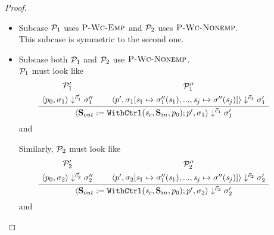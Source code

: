 \begin{proof}
\begin{itemize}
\begin{itemize}
	   	By IH on \eqref{\eqnumthree{23}} with $\MP_1''$, $\MP_2'$, \eqref{eq-lem24-c3-4}, we get a derivation 
	   	\[ \seval{p'}{\sgmbpp{1} \x{\S} \sgmbe{2}}{\cc }{\sgmpx}, \] 
	   	
	   	and replacing the start store with the right-hand side of \eqref{\eqnumthree{24}} gives us a derivation $\MP'$ of
	   	
	   	\[\seval{p'}{(\sgmx) [\s_1 \|-> \sgm_1''(\s_1),..., \s_j \|-> \sgm_1''(\s_j)]}{\cc }{\sgmpx} \] 
	   	
	   	With $\eqref{\eqnumthree{25}}$, we replcace $\sgm_1''(i)$ with $\sgm_0(i)$ for all $i \in \{1,...,j\}$, then we obtain  $\MP''$ of
	   	
   		\[\seval{p'}{(\sgmx) [\s_1 \|-> \sgm_0(\s_1),..., \s_j \|-> \sgm_0(\s_j)]}{\cc }{\sgmpx} \] 
   		
   		By the definition of store concatenation with $\eqref{\eqnumthree{20}}$, $\eqref{\eqnumthree{21}}$, we have
   		$$\sgmx(s_c) = \sgm_1(s_c) {\++} \sgm_2(s_c) = \c_1' =  \<()| ...\'>$$
   		
   		Therefore, we use the rule $\PName{Wc-Nonemp}$ to build $\MP$ as follows
   	
   		$$\PT{
   			\UCN{\MP_0}{\seval{p_0}{\sgmx}{\c_1'}{\sgm_0}}
   			\UCN{\MP''}{\seval{p'}{(\sgmx) [\s_1 \|-> \sgm_0(\s_1),..., \s_j \|-> \sgm_0(\s_j)]}{\cc }{\sgmpx}}
   			\BC{\seval{\casethree}{\sgmx}{\cc}{\sgmpx}}
   		}$$ and we are done. \\
   	
	\item Subcase $\mathcal{P}_1$ uses  $\textsc{P-Wc-Emp}$ and $\mathcal{P}_2$ uses $\PName{Wc-Nonemp}$. \\	
	This subcase is symmetric to the second one. \\
 		
	\item Subcase both $\mathcal{P}_1$ and $\mathcal{P}_2$ use $\PName{Wc-Nonemp}$. \\
 	$\mathcal{P}_1$ must look like
 	$$\PT{
 		\UCN{\MP_1'}{\seval{p_0}{\sgm_1}{\c_1'}{\sgm_1''}}
 		\UCN{\MP_1''}{\seval{p'}{\sgm_1[\s_1 \|-> \sgm_1''(\s_1),...,\s_j \|-> \sgm''(\s_j)]}{\c_1}{\sgm_1'}}
 		\BC{\seval{\casethree}{\sgm_1}{\c_1}{\sgm_1'}}
 	}$$
 	and 
 	
 	Similarly, $\mathcal{P}_2$ must look like
 	$$\PT{
 		\UCN{\MP_2'}{\seval{p_0}{\sgm_2}{\c_2'}{\sgm_2''}}
 		\UCN{\MP_2''}{\seval{p'}{\sgm_2[\s_1 \|-> \sgm_1''(\s_1),...,\s_j \|-> \sgm''(\s_j)]}{\c_2}{\sgm_2'}}
 		\BC{\seval{\casethree}{\sgm_2}{\c_2}{\sgm_2'}}
 	}$$
 	and 
    

\end{itemize}
\end{itemize}
\end{proof}
